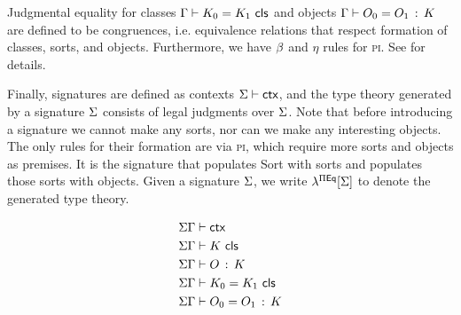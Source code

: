 Judgmental equality for classes $\Gamma \vdash K_{0} = K_{1} \,\, \mathsf{cls}$ and objects
$\Gamma \vdash O_{0} = O_{1} \, : \, K$ are defined to be congruences,
i.e. equivalence relations that respect formation of classes,
sorts, and objects.
Furthermore, we have $\beta$ and $\eta$ rules for \textsc{pi}.
See \cite{harper2021equational} for details. %

Finally, signatures are defined as contexts $\Sigma \vdash \mathsf{ctx}$,
and the type theory generated by a signature $\Sigma$ consists of
legal judgments over $\Sigma$.
Note that before introducing a signature we cannot make any sorts,
nor can we make any interesting objects.
The only rules for their formation are via \textsc{pi},
which require more sorts and objects as premises.
It is the signature that populates \textsf{Sort} with sorts
and populates those sorts with objects.
Given a signature $\Sigma$, we write $\lambda^{\Pi \mathsf{Eq}}[\Sigma]$ to denote the
generated type theory.

\begin{align*}
  &\Sigma\Gamma \vdash \mathsf{ctx} \\
  &\Sigma\Gamma \vdash K \,\, \mathsf{cls} \\
  &\Sigma\Gamma \vdash O \, : \, K \\
  &\Sigma\Gamma \vdash K_{0} = K_{1} \,\, \mathsf{cls} \\
  &\Sigma\Gamma \vdash O_{0} = O_{1} \, : \, K
\end{align*}

